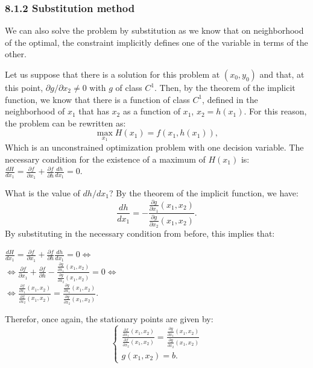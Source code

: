 \documentclass[0pt, a4paper]{article}
\begin{document}
\subsubsection*{8.1.2 Substitution method}

We can also solve the problem by substitution as we know that on neighborhood of the optimal, the constraint implicitly defines one of the variable in terms of the other.

Let us suppose that there is a solution for this problem at $(x_0,y_0)$ and that, at this point, $\partial g/\partial x_2\neq0$ with $g$ of class $C^1$. Then, by the theorem of the implicit function, we know that there is a function of class $C^1$, defined in the neighborhood of $x_1$ that has $x_2$ as a function of $ x_1 $, $x_2=h(x_1)$. For this reason, the problem can be rewritten as:
$$\max_{x_1} H(x_1)=f(x_1,h(x_1)),$$
Which is an unconstrained optimization problem with one decision variable. The necessary condition for the existence of a maximum of $H(x_1)$ is: $\frac{dH}{dx_1}=\frac{\partial f}{\partial x_1}+\frac{\partial f}{\partial h}\frac{dh}{dx_1}=0$.

What is the value of $dh/dx_1$? By the theorem of the implicit function, we have:
$$\frac{dh}{dx_1}=-\frac{\frac{\partial g}{\partial x_1}(x_1,x_2)}{\frac{\partial g}{\partial x_2}(x_1,x_2)}.$$
By substituting in the necessary condition from before, this implies that:
\begin{center}
	$\frac{dH}{dx_1}=\frac{\partial f}{\partial x_1}+\frac{\partial f}{\partial h}\frac{dh}{dx_1}=0\Leftrightarrow$\\
	$\Leftrightarrow\frac{\partial f}{\partial x_1}+\frac{\partial f}{\partial h}-\frac{\frac{\partial g}{\partial x_1}(x_1,x_2)}{\frac{\partial g}{\partial x_2}(x_1,x_2)}=0\Leftrightarrow$\\
	$\Leftrightarrow\frac{\frac{\partial f}{\partial x_1}(x_1,x_2)}{\frac{\partial f}{\partial x_2}(x_1,x_2)}=\frac{\frac{\partial g}{\partial x_1}(x_1,x_2)}{\frac{\partial g}{\partial x_2}(x_1,x_2)}$.
\end{center}
Therefor, once again, the stationary points are given by:
$$
\begin{cases}
\frac{\frac{\partial f}{\partial x_1}(x_1,x_2)}{\frac{\partial f}{\partial x_2}(x_1,x_2)}=\frac{\frac{\partial g}{\partial x_1}(x_1,x_2)}{\frac{\partial g}{\partial x_2}(x_1,x_2)}\\
g(x_1,x_2)=b.
\end{cases}
$$
\end{document}
